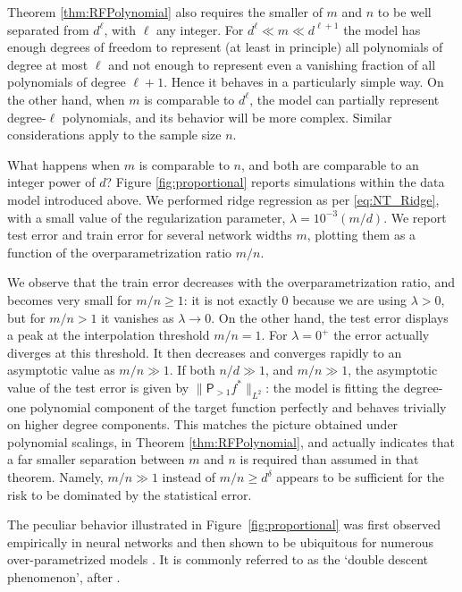 Theorem \ref{thm:RFPolynomial}  also requires the smaller of $m$ and $n$ to be well separated from $d^{\ell}$,
with $\ell$ any integer. For $d^{\ell}\ll m\ll d^{\ell+1}$ the model has enough degrees of freedom to represent (at least in principle) all polynomials of degree at most $\ell$ and not enough to represent even a vanishing fraction of all polynomials of degree $\ell+1$. Hence it behaves in a particularly simple way. On the other hand, when $m$ is comparable to $d^{\ell}$, the model can partially represent degree-$\ell$
polynomials, and its behavior will be more complex. Similar considerations apply to the sample size $n$.

What happens when $m$ is comparable to $n$, and both are comparable to an integer power of $d$? Figure \ref{fig:proportional} reports simulations within the data model introduced above. We performed ridge regression as per \eqref{eq:NT_Ridge}, with a small value of the regularization parameter, $\lambda=10^{-3}(m/d)$.
We report test error and train error for several network widths $m$, plotting them as a function of the overparametrization ratio $m/n$.

We observe that the train error decreases with the overparametrization ratio, and becomes very small for $m/n\ge 1$: it is not exactly $0$ because we are using $\lambda>0$, but for $m/n>1$ it vanishes as $\lambda\to 0$. On the other hand, the test error displays a peak at the interpolation threshold $m/n=1$. For $\lambda=0^+$ the error actually diverges at this threshold. It  then decreases and converges rapidly to an asymptotic value as $m/n\gg 1$. If both $n/d\gg 1$, and $m/n\gg 1$, the asymptotic value of the test error is given by $\|{\mathsf P}_{>1} f^*\|_{L^2}$:
the model is fitting the degree-one polynomial component of the target function perfectly and behaves trivially on higher degree components. This matches the picture obtained under polynomial scalings, in Theorem \ref{thm:RFPolynomial}, and actually indicates that a far smaller separation between $m$ and $n$ is required than assumed in that theorem. Namely, $m/n\gg 1$  instead of $m/n\ge d^{\delta}$
appears to be sufficient for the risk to be dominated by the statistical error.

The peculiar behavior illustrated in Figure~\ref{fig:proportional}
was first observed empirically in neural networks and then shown to be ubiquitous for numerous over-parametrized models \cite{geiger2019jamming,spigler2019jamming,belkin2019reconciling}. It is commonly referred to as the `double descent phenomenon', after \cite{belkin2019reconciling}.

